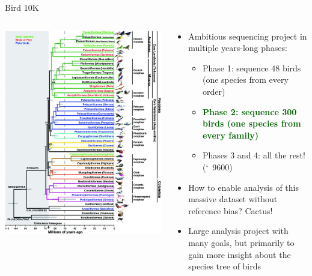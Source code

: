 \documentclass[10pt,
               hyperref={bookmarks=false,
                         bookmarksopen=false,
                         colorlinks=true,
                         linkcolor=blue,
                         urlcolor=blue},
               xcolor={svgnames,table}]{beamer}
\begin{document}
\begin{frame}{Bird 10K}
    \begin{columns}
        \begin{column}{0.5\textwidth}
            \includegraphics[width=\columnwidth]{images/B10K_tree.jpg}
        \end{column}
        \begin{column}{0.5\textwidth}
            \begin{itemize}
                \item Ambitious sequencing project in multiple years-long phases: \begin{itemize}
                    \item Phase 1: sequence 48 birds (one species from every order)
                    \item \textbf{\textcolor{DarkGreen}{Phase 2: sequence 300 birds (one species from every family)}}
                    \item Phases 3 and 4: all the rest! (\char`~9600)
                \end{itemize}
                \item How to enable analysis of this massive dataset without reference bias? Cactus!
                \item Large analysis project with many goals, but primarily to gain more insight about the species tree of birds
            \end{itemize}
        \end{column}
    \end{columns}
\end{frame}
\end{document}
